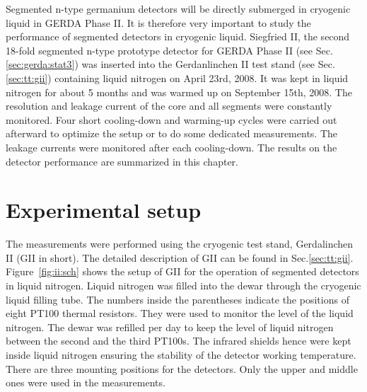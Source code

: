 Segmented n-type germanium detectors will be directly submerged in cryogenic liquid in GERDA Phase II. It is therefore very important to study the performance of segmented detectors in cryogenic liquid. Siegfried II, the second 18-fold segmented n-type prototype detector for GERDA Phase II (see Sec.\ref{sec:gerda:stat3}) was inserted into the Gerdanlinchen II test stand (see Sec.\ref{sec:tt:gii}) containing liquid nitrogen on April 23rd, 2008. It was kept in liquid nitrogen for about 5 months and was warmed up on September 15th, 2008. The resolution and leakage current of the core and all segments were constantly monitored. Four short cooling-down and warming-up cycles were carried out afterward to optimize the setup or to do some dedicated measurements. The leakage currents were monitored after each cooling-down. The results on the detector performance are summarized in this chapter.

\section{Experimental setup}
\label{sec:gii:setup}
The measurements were performed using the cryogenic test stand, Gerdalinchen II (GII in short). The detailed description of GII can be found in Sec.\ref{sec:tt:gii}.  Figure~\ref{fig:ii:sch} shows the setup of GII for the operation of segmented detectors in liquid nitrogen. Liquid nitrogen was filled into the dewar through the cryogenic liquid filling tube. The numbers inside the parentheses indicate the positions of eight PT100 thermal resistors. They were used to monitor the level of the liquid nitrogen. The dewar was refilled per day to keep the level of liquid nitrogen between the second and the third PT100s. The infrared shields hence were kept inside liquid nitrogen ensuring the stability of the detector working temperature. There are three mounting positions for the detectors. Only the upper and middle ones were used in the measurements.

